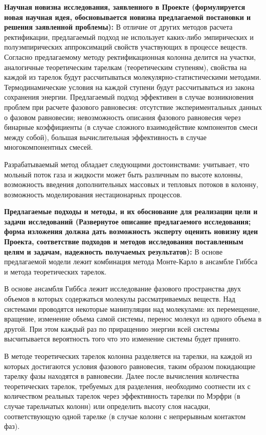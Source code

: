 \textbf{Научная новизна исследования, заявленного в Проекте (формулируется новая научная идея, обосновывается новизна предлагаемой постановки и решения заявленной проблемы):}
В отличие от других методов расчета ректификации, предлагаемый подход не использует каких-либо эмпирических и полуэмпирических аппроксимаций свойств участвующих в процессе веществ. Согласно предлагаемому методу ректификационная колонна делится на участки, аналогичные теоретическим тарелкам (теоретическим ступеням), свойства на каждой из тарелок будут рассчитываться молекулярно-статистическими методами. Термодинамические условия на каждой ступени будут рассчитываться из закона сохранения энергии. Предлагаемый подход эффективен в случае возникновения проблем при расчете фазового равновесия: отсутствие экспериментальных данных о фазовом равновесии; невозможность описания фазового равновесия через бинарные коэффициенты (в случае сложного взаимодействие компонентов смеси между собой), большая вычислительная эффективность в случае многокомпонентных смесей. 

Разрабатываемый метод обладает следующими достоинствами: учитывает, что мольный поток газа и жидкости может быть различным по высоте колонны, возможность введения дополнительных массовых и тепловых потоков в колонну, возможность моделирования нестационарных процессов. 
 
\textbf{Предлагаемые подходы и методы, и их обоснование для реализации цели и задачи исследований (Развернутое описание предлагаемого исследования; форма изложения должна дать возможность эксперту оценить новизну идеи Проекта, соответствие подходов и методов исследования поставленным целям и задачам, надежность получаемых результатов):}
В основе предлагаемой модели лежит комбинация метода Монте-Карло в ансамбле Гиббса и метода теоретических тарелок.

В основе ансамбля Гиббса лежит исследование фазового пространства двух объемов в которых содержаться молекулы рассматриваемых веществ. Над системами проводятся некоторые манипуляции над молекулами: их перемещение, вращение, изменение объема самой системы, перенос молекул из одного объема в другой.  При этом каждый раз по приращению энергии всей системы высчитывается вероятность того что это изменение системы будет принято.

В методе теоретических тарелок колонна разделяется на тарелки, на каждой из которых достигаются условия фазового равновесия, таким образом покидающие тарелку фазы находятся в равновесии. Далее после вычисления количества теоретических тарелок, требуемых для разделения, необходимо соотнести их с количеством реальных тарелок через эффективность тарелки по Мэрфри (в случае тарельчатых колонн) или определить высоту слоя насадки, соответствующую одной тарелке (в случае колонн с непрерывным контактом фаз).

